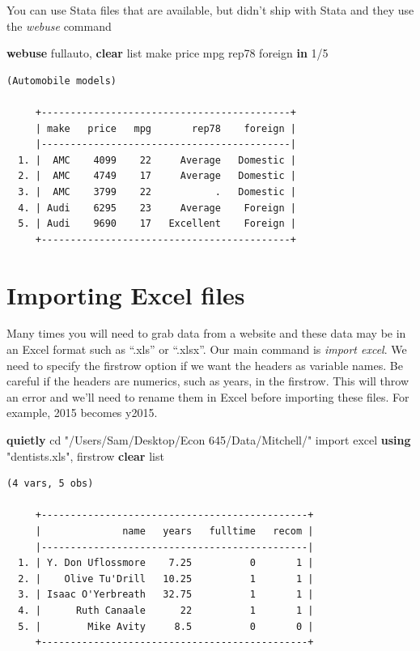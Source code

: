 \documentclass[
]{book}
\newenvironment{Shaded}{\begin{snugshade}}{\end{snugshade}}
\newcommand{\KeywordTok}[1]{\textcolor[rgb]{0.13,0.29,0.53}{\textbf{#1}}}
\newcommand{\NormalTok}[1]{#1}
\newcommand{\OtherTok}[1]{\textcolor[rgb]{0.56,0.35,0.01}{#1}}
\newcommand{\StringTok}[1]{\textcolor[rgb]{0.31,0.60,0.02}{#1}}
\begin{document}
You can use Stata files that are available, but didn't ship with Stata and
they use the \emph{webuse} command

\begin{Shaded}
\begin{Highlighting}[]
\KeywordTok{webuse}\NormalTok{ fullauto, }\KeywordTok{clear}
\OtherTok{list}\NormalTok{ make price mpg rep78 foreign }\KeywordTok{in}\NormalTok{ 1/5}
\end{Highlighting}
\end{Shaded}

\begin{verbatim}
(Automobile models)

     +-------------------------------------------+
     | make   price   mpg       rep78    foreign |
     |-------------------------------------------|
  1. |  AMC    4099    22     Average   Domestic |
  2. |  AMC    4749    17     Average   Domestic |
  3. |  AMC    3799    22           .   Domestic |
  4. | Audi    6295    23     Average    Foreign |
  5. | Audi    9690    17   Excellent    Foreign |
     +-------------------------------------------+
\end{verbatim}

\section{Importing Excel files}\label{importing-excel-files}

Many times you will need to grab data from a website and these data may be in an Excel format such as ``.xls'' or ``.xlsx''. Our main command is \emph{import excel}. We need to specify the firstrow option if we want the headers as variable names. Be careful if the headers are numerics, such as years, in the firstrow. This will throw an error and we'll need to rename them in Excel before importing these files. For example, 2015 becomes y2015.

\begin{Shaded}
\begin{Highlighting}[]
\KeywordTok{quietly}\NormalTok{ cd }\StringTok{"/Users/Sam/Desktop/Econ 645/Data/Mitchell/"}
\NormalTok{import excel }\KeywordTok{using} \StringTok{"dentists.xls"}\NormalTok{, firstrow }\KeywordTok{clear}
\OtherTok{list} 
\end{Highlighting}
\end{Shaded}

\begin{verbatim}
(4 vars, 5 obs)

     +----------------------------------------------+
     |              name   years   fulltime   recom |
     |----------------------------------------------|
  1. | Y. Don Uflossmore    7.25          0       1 |
  2. |    Olive Tu'Drill   10.25          1       1 |
  3. | Isaac O'Yerbreath   32.75          1       1 |
  4. |      Ruth Canaale      22          1       1 |
  5. |        Mike Avity     8.5          0       0 |
     +----------------------------------------------+
\end{verbatim}
\end{document}
